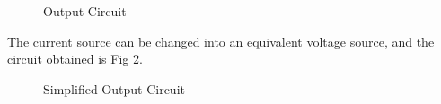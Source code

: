 \begin{enumerate}[label=\arabic*.,ref=\theenumi]
\begin{figure}[!ht]
	\begin{center}
		
		\resizebox{\columnwidth}{!}{}
	\end{center}
\caption{Output Circuit}
\label{fig:ee18btech11038_outckt}
\end{figure}

The current source can be changed into an equivalent voltage source, and the circuit obtained is Fig \ref{fig:ee18btech11038_simpout}.
\begin{figure}[!ht]
	\begin{center}
		
		\resizebox{\columnwidth}{!}{}
	\end{center}
\caption{Simplified Output Circuit}
\label{fig:ee18btech11038_simpout}
\end{figure}


\end{enumerate}

